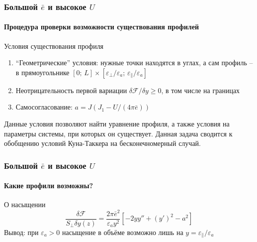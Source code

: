 \documentclass[utf8,secheader]{beamer}
\newcommand{\FF}{\mathcal{F}}
\begin{document}


\begin{frame}
\frametitle{Большой $\bar{e}$ и высокое $U$}
\framesubtitle{Процедура проверки возможности существования профилей}
\begin{block}{Условия существования профиля}
\begin{enumerate}
\item ``Геометрические'' условия: нужные точки находятся в углах, а сам профиль -- в прямоугольнике $[0;\,L] \times [\varepsilon_\bot/\varepsilon_a;\,\varepsilon_\parallel/\varepsilon_a]$
\item Неотрицательность первой вариации $\delta \FF / \delta y \geq 0$, в том числе на границах
\item Самосогласование: $a = J(J_1 - U/(4\pi\bar{e}))$
\end{enumerate}
\end{block}
Данные условия позволяют найти уравнение профиля, а также условия на параметры системы, при которых он существует. Данная задача сводится к обобщению условий Куна-Таккера на бесконечномерный случай. 
\end{frame}


\begin{frame}
\frametitle{Большой $\bar{e}$ и высокое $U$}
\framesubtitle{Какие профили возможны?}
\begin{block}{О насыщении}
\begin{equation}
\frac{\delta \FF}{S_\bot\delta y(z)} = \frac{2\pi\bar{e}^2}{\varepsilon_a y^2}\left[ -2yy'' + (y')^2 - a^2 \right]
\end{equation}
Вывод: при $\varepsilon_a > 0$ насыщение в объёме возможно лишь на $y = \varepsilon_\parallel / \varepsilon_a$
\end{block}
\end{frame}
\end{document}
